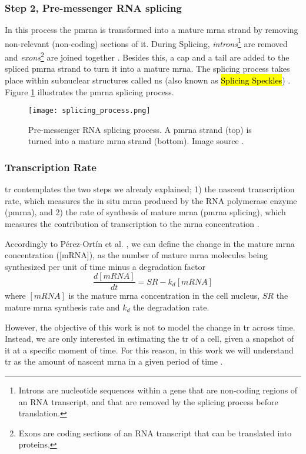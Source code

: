 \subsubsection{Step 2, Pre-messenger RNA splicing}
In this process the \gls{pmrna} is transformed into a mature \gls{mrna} strand by removing non-relevant (non-coding) sections of it.
During Splicing, \textit{introns}\footnote{Introns are nucleotide sequences within a gene that are non-coding regions of an RNA transcript, and that are removed by the splicing process before translation.} are removed and \textit{exons}\footnote{Exons are coding sections of an RNA transcript that can be translated into proteins.} are joined together \cite{Biochemistry}. Besides this, a cap and a tail are added to the spliced \gls{pmrna} strand to turn it into a mature \gls{mrna}. The splicing process takes place within subnuclear structures called \gls{ns} (also known as \hl{Splicing Speckles}) \cite{spector2011nuclear}.
Figure \ref{fig:BB:splicing} illustrates the \gls{pmrna} splicing process.

\begin{figure}[htb]
  \centering
  \texttt{[image: splicing\_process.png]}
  \caption{Pre-messenger RNA splicing process. A \gls{pmrna} strand (top) is turned into a mature \gls{mrna} strand (bottom). Image source \cite{wiki:Primary_transcript}.}
  \label{fig:BB:splicing}
\end{figure}

\subsubsection{Transcription Rate}

\gls{tr} contemplates the two steps we already explained; 1) the nascent transcription rate, which measures the in situ \gls{mrna} produced by the RNA polymerase enzyme (\gls{pmrna}), and 2) the rate of synthesis of mature \gls{mrna} (\gls{pmrna} splicing), which measures the contribution of transcription to the \gls{mrna} concentration \cite{what_is_tr}.

Accordingly to Pérez-Ortín et al. \cite{what_is_tr}, we can define the change in the mature \gls{mrna} concentration ([mRNA]), as the number of mature \gls{mrna} molecules being synthesized per unit of time minus a degradation factor
\begin{equation}
  \frac{d[mRNA]}{dt} = SR - k_d [mRNA]
\end{equation}
\noindent where $[mRNA]$ is the mature \gls{mrna} concentration in the cell nucleus, $SR$ the mature \gls{mrna} synthesis rate and $k_d$ the degradation rate.

However, the objective of this work is not to model the change in \gls{tr} across time. Instead, we are only interested in estimating the \gls{tr} of a cell, given a snapshot of it at a specific moment of time. For this reason, in this work we will understand \gls{tr} as the amount of nascent \gls{mrna} in a given period of time \cite{wansink1993fluorescent}.
